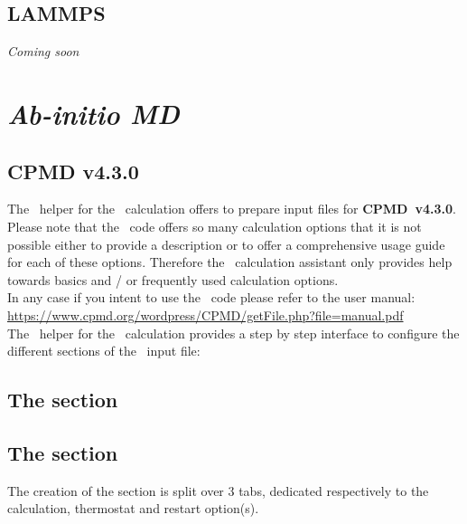 \newpage
\subsection{LAMMPS}

{\em{Coming soon}}

\newpage

\section{{\em{Ab-initio MD}}}

\subsection{CPMD v4.3.0}

The \atomes\ helper for the \cpmd\ calculation offers to prepare input files for {\bf{CPMD~v4.3.0}}. 
Please note that the \cpmd\ code offers so many calculation options that it is not possible either to provide a description 
or to offer a comprehensive usage guide for each of these options.  
Therefore the \cpmd\ calculation assistant only provides help towards basics and / or frequently used calculation options. \\[0.25cm]
In any case if you intent to use the \cpmd\ code please refer to the user manual: \\[0.25cm]
\href{https://www.cpmd.org/wordpress/CPMD/getFile.php?file=manual.pdf}{https://www.cpmd.org/wordpress/CPMD/getFile.php?file=manual.pdf}\\[0.25cm]
The \atomes\ helper for the \cpmd\ calculation provides a step by step interface to configure the different sections of the \cpmd\ input file:

\subsection*{The  section}


\newpage

\subsection*{The  section}

The creation of the  section is split over 3 tabs, dedicated respectively to the calculation, thermostat and restart option(s). 

